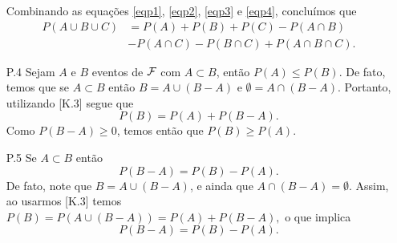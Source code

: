 \begin{frame}


\begin{enumerate}
\item[]	Combinando as equações \eqref{eqp1}, \eqref{eqp2}, \eqref{eqp3} e \eqref{eqp4}, concluímos que 
	\[
	\begin{aligned}
	P(A\cup B\cup C)&=P(A)+P(B)+P(C) - P(A\cap B) \\ & - P(A\cap C)  - P(B\cap C)  +P(A\cap B\cap C).
	\end{aligned}
	\]
\item[P.4] Sejam  $A$ e $B$ eventos de ${\cal F}$ com $A  \subset  B$, então $P(A) \leq P(B).$ De fato, temos que se $ A\subset B $ então $ B = A\cup (B - A) $ e  $ \emptyset = A\cap (B - A) .$  Portanto, utilizando [K.3] segue que 
\[P(B)=P(A)+P(B- A).\] 	 
Como $ P(B - A)\geq 0 $, temos então que $ P(B)\geq P(A).$

\item[P.5] Se $ A\subset B$ então  $$P(B- A)=P(B)-P(A).$$ De fato, note que $ B=A\cup (B- A) $, e ainda que $ A\cap (B - A)=\emptyset $. Assim, ao usarmos [K.3] temos $P(B)=P(A\cup (B- A))=P(A)+P(B- A),$ o que implica $$P(B- A)=P(B)-P(A).$$ 	
\end{enumerate}
\end{frame}



%

